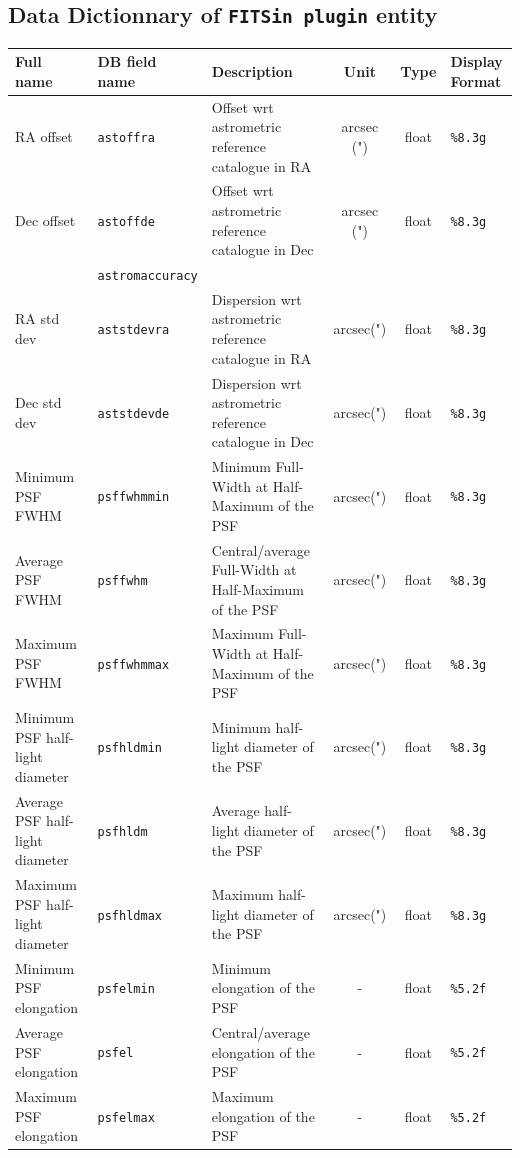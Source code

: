 \documentclass[twoside,a4paper]{article}
\begin{document}
\subsection{Data Dictionnary of {\tt FITSin plugin} entity}
\begin{table}
\centering
\footnotesize{
\begin{tabular}{|l|l|l|c|c|l|}
\hline
Full name & DB field name & Description & Unit & Type & Display Format\\
\hline
RA offset & {\tt astoffra} & Offset wrt astrometric reference catalogue in RA & arcsec (")& float & {\tt \%8.3g}\\
Dec offset & {\tt astoffde} & Offset wrt astrometric reference catalogue in Dec & arcsec (") & float & {\tt \%8.3g}\\
& {\tt astromaccuracy} & & & &\\
RA std dev & {\tt aststdevra} & Dispersion wrt astrometric reference catalogue in RA & arcsec(") & float & {\tt \%8.3g}\\
Dec std dev & {\tt aststdevde} & Dispersion wrt astrometric reference catalogue in Dec & arcsec(") & float & {\tt \%8.3g}\\
Minimum PSF FWHM & {\tt psffwhmmin} & Minimum Full-Width at Half-Maximum of the PSF & arcsec(") & float & {\tt \%8.3g}\\
Average PSF FWHM & {\tt psffwhm} & Central/average Full-Width at Half-Maximum of the PSF & arcsec(") & float & {\tt \%8.3g}\\
Maximum PSF FWHM & {\tt psffwhmmax} & Maximum Full-Width at Half-Maximum of the PSF & arcsec(") & float & {\tt \%8.3g}\\
Minimum PSF half-light diameter & {\tt psfhldmin} & Minimum half-light diameter of the PSF & arcsec(") & float & {\tt \%8.3g}\\
Average PSF half-light diameter & {\tt psfhldm} & Average half-light diameter of the PSF & arcsec(") & float & {\tt \%8.3g}\\
Maximum PSF half-light diameter & {\tt psfhldmax} & Maximum half-light diameter of the PSF & arcsec(") & float & {\tt \%8.3g}\\
Minimum PSF elongation & {\tt psfelmin} & Minimum elongation of the PSF & - & float & {\tt \%5.2f}\\
Average PSF elongation & {\tt psfel} & Central/average elongation of the PSF & - & float & {\tt \%5.2f}\\
Maximum PSF elongation & {\tt psfelmax} & Maximum elongation of the PSF & - & float & {\tt \%5.2f}\\

\end{tabular}}
\end{table}
\end{document}
